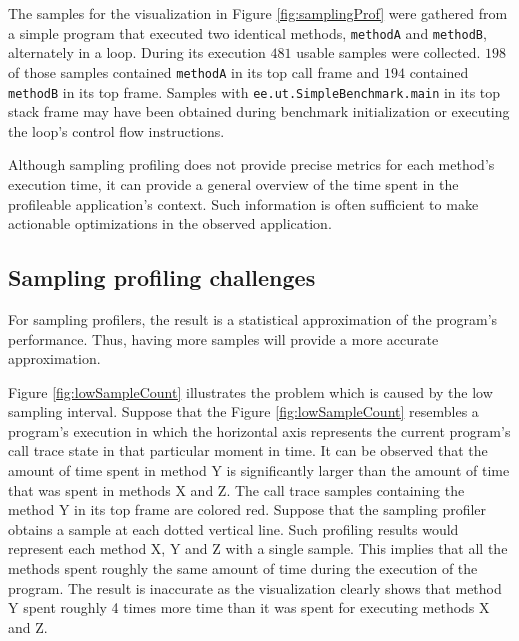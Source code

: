 \documentclass[..thesis.tex]{subfiles}
\begin{document}
The samples for the visualization in Figure \ref{fig:samplingProf} were gathered from a simple program that executed two identical methods, \texttt{methodA} and \texttt{methodB}, alternately in a loop. During its execution $481$ usable samples were collected. $198$ of those samples contained \texttt{methodA} in its top call frame and $194$ contained \texttt{methodB} in its top frame. Samples with \texttt{ee.ut.SimpleBenchmark.main} in its top stack frame may have been obtained during benchmark initialization or executing the loop's control flow instructions.

Although sampling profiling does not provide precise metrics for each method's execution time, it can provide a general overview of the time spent in the profileable application's context. Such information is often sufficient to make actionable optimizations in the observed application.

\subsection{Sampling profiling challenges}

For sampling profilers, the result is a statistical approximation of the program's performance. Thus, having more samples will provide a more accurate approximation. 

Figure \ref{fig:lowSampleCount} illustrates the problem which is caused by the low sampling interval. Suppose that the Figure \ref{fig:lowSampleCount} resembles a program's execution in which the horizontal axis represents the current program's call trace state in that particular moment in time. It can be observed that the amount of time spent in method Y is significantly larger than the amount of time that was spent in methods X and Z. The call trace samples containing the method Y in its top frame are colored red. Suppose that the sampling profiler obtains a sample at each dotted vertical line. Such profiling results would represent each method X, Y and Z with a single sample. This implies that all the methods spent roughly the same amount of time during the execution of the program. The result is inaccurate as the visualization clearly shows that method Y spent roughly 4 times more time than it was spent for executing methods X and Z.
\end{document}
